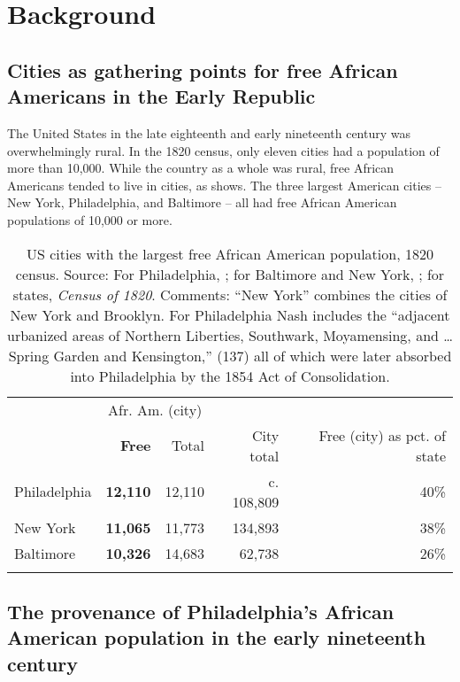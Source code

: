\documentclass[output=paper,colorlinks,citecolor=brown]{langscibook}
\begin{document}
 
\section{Background} \label{section2}
\subsection{Cities as gathering points for free African Americans in the Early Republic}

The United States in the late eighteenth and early nineteenth century was overwhelmingly rural. In the 1820 census, only eleven cities had a population of more than 10,000. While the country as a whole was rural, free African Americans tended to live in cities, as  shows. The three largest American cities -- New York, Philadelphia, and Baltimore -- all had free African American populations of 10,000 or more.

\begin{table}  
\caption{US cities with the largest free African American population, 1820 census. Source: For Philadelphia, \citet[137]{Nash1988}; for Baltimore and New York, \citet[247]{Curry1986}; for states, \textit{Census of 1820}. Comments: “New York” combines the cities of New York and Brooklyn. For Philadelphia Nash includes the “adjacent urbanized areas of Northern Liberties, Southwark, Moyamensing, and … Spring Garden and Kensington,” (137) all of which were later absorbed into Philadelphia by the 1854 Act of Consolidation.}
\begin{tabular}{l rrrr}
\lsptoprule
& \multicolumn{2}{c}{Afr. Am. (city)}\\\cmidrule(lr){2-3}
& \textbf{Free} & Total & City total & Free (city) as pct. of state\\\midrule
Philadelphia & \textbf{12,110} & 12,110 & c.  108,809 & 40\%\\
New York & \textbf{11,065} & 11,773 &  134,893 & 38\%\\
Baltimore & \textbf{10,326} & 14,683 &  62,738 & 26\%\\
\lspbottomrule
\end{tabular}
\label{tab:1 singler:1}
\end{table}


\subsection{The provenance of Philadelphia’s African American population in the early nineteenth century}
\end{document}
